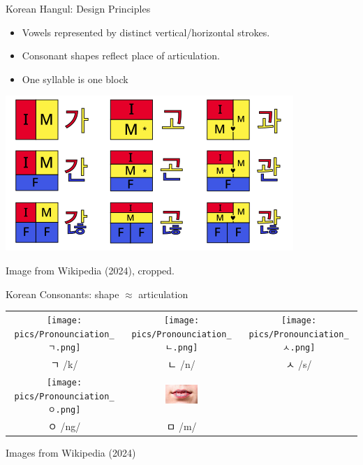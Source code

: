 \documentclass[xetex]{beamer}
\begin{document}
\begin{frame}{Korean Hangul: Design Principles}
\begin{itemize}
\item Vowels represented by distinct vertical/horizontal strokes.
\item Consonant shapes reflect place of articulation.
\item One syllable is one block
\end{itemize}
\begin{center}
    \includegraphics[height=0.5\textheight]{pics/Jamo_placement}
  \end{center}
Image from Wikipedia (2024), cropped.
\end{frame}

\begin{frame}{Korean Consonants:  shape $\approx$ articulation}

  \begin{center}
  \begin{tabular}{ccc}
\texttt{[image: pics/Pronounciation\_ㄱ.png]} &
\texttt{[image: pics/Pronounciation\_ㄴ.png]} &
\texttt{[image: pics/Pronounciation\_ㅅ.png]} \\
\textkorean{ㄱ} /k/ & \textkorean{ㄴ} /n/ &  \textkorean{ㅅ} /s/ \\

 \texttt{[image: pics/Pronounciation\_ㅇ.png]} &
   \includegraphics[width=0.3\textwidth]{pics/Pronounciation_ㅁ.jpg} \\
\textkorean{ㅇ} /ng/ & \textkorean{ㅁ} /m/ \\
    \end{tabular}
    
\end{center}
Images from Wikipedia (2024)
\end{frame}
\end{document}
